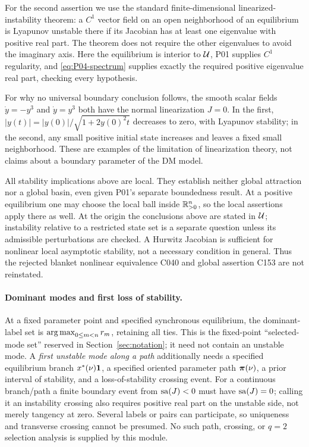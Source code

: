 For the second assertion we use the standard finite-dimensional
linearized-instability theorem: a $C^1$ vector field on an open
neighborhood of an equilibrium is Lyapunov unstable there if its
Jacobian has at least one eigenvalue with positive real part.
The theorem does not require the other eigenvalues to avoid the
imaginary axis. Here the equilibrium is interior to $\mathcal{U}$, P01
supplies $C^1$ regularity, and \eqref{eq:P04-spectrum} supplies exactly
the required positive eigenvalue real part, checking every hypothesis.

For why no universal boundary conclusion follows, the smooth scalar
fields $\dot y=-y^3$ and $\dot y=y^3$ both have the normal linearization
$J=0$. In the first, $|y(t)|=|y(0)|/\sqrt{1+2y(0)^2t}$ decreases
to zero, with Lyapunov stability; in the second, any small positive
initial state increases and leaves a fixed small neighborhood.
These are examples of the limitation of linearization theory, not
claims about a boundary parameter of the DM model.

All stability implications above are local. They establish neither
global attraction nor a global basin, even given P01's separate
boundedness result. At a positive equilibrium one may choose the
local ball inside $\mathbb{R}_{>0}^{n}$, so the local assertions apply there
as well. At the origin the conclusions above are stated in
$\mathcal{U}$; instability relative to a restricted state set is a
separate question unless its admissible perturbations are checked.
A Hurwitz Jacobian is sufficient for nonlinear local asymptotic
stability, not a necessary condition in general. Thus the rejected
blanket nonlinear equivalence C040 and global assertion C153 are
not reinstated.

\paragraph{Dominant modes and first loss of stability.}
At a fixed parameter point and specified synchronous equilibrium,
the dominant-label set is $\operatorname*{arg\,max}_{0\le m<n}r_m$, retaining all
ties. This is the fixed-point ``selected-mode set'' reserved in
Section~\ref{sec:notation}; it need not contain an unstable mode.
A \emph{first unstable mode along a path} additionally needs a
specified equilibrium branch $x^*(\nu)\mathbf{1}$, a specified oriented
parameter path $\boldsymbol{\pi}(\nu)$, a prior interval of stability, and a
loss-of-stability crossing event. For a continuous branch/path a
finite boundary event from $\operatorname{sa}(J)<0$ must have $\operatorname{sa}(J)=0$;
calling it an instability crossing also requires positive real part
on the unstable side, not merely tangency at zero. Several labels
or pairs can participate, so uniqueness and transverse crossing
cannot be presumed. No such path, crossing, or $q=2$ selection
analysis is supplied by this module.

